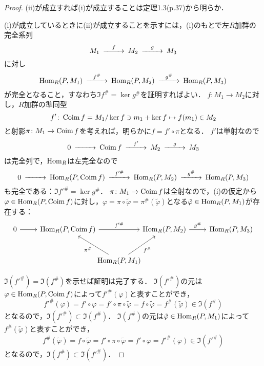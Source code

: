 \begin{proof}
  (ii)が成立すれば(i)が成立することは定理1.3(p.37)から明らか．

  (i)が成立しているときに(ii)が成立することを示すには，(i)のもとで左$R$加群の完全系列
  \[
  \begin{CD}
    M_1 @>{f}>> M_2 @>{g}>> M_3
  \end{CD}
  \]
  に対し
  \[
  \begin{CD}
    \Hom_R(P, M_1) @>{f^\#}>> \Hom_R(P, M_2) @>{g^\#}>> \Hom_R(P, M_3)
  \end{CD}
  \]
  が完全となること，すなわち$\Im f^\# = \ker g^\#$を証明すればよい．
  $f \colon M_1 \to M_2$に対し，$R$加群の準同型
  \[ f' \colon \operatorname{Coim} f = M_1 / \ker f \ni m_1 + \ker f \mapsto f(m_1) \in M_2 \]
  と射影$\pi \colon M_1 \to \operatorname{Coim} f$を考えれば，明らかに$f = f' \circ \pi$となる．
  $f'$は単射なので
  \[
  \begin{CD}
    0 @>>> \Coim f @>{f'}>> M_2 @>{g}>> M_3
  \end{CD}
  \]
  は完全列で，$\operatorname{Hom}_R$は左完全なので
  \[
  \begin{CD}
    0 @>>> \Hom_R(P, \Coim f) @>{f'^\#}>> \Hom_R(P, M_2) @>{g^\#}>> \Hom_R(P, M_3)
  \end{CD}
  \]
  も完全である：$\Im f'^\# = \ker g^\#$．
  $\pi \colon M_1 \to \operatorname{Coim} f$は全射なので，(i)の仮定から$\varphi \in \operatorname{Hom}_R(P, \operatorname{Coim} f)$に対し，$\varphi = \pi \circ \tilde{\varphi} = \pi^\# (\tilde\varphi)$となる$\tilde{\varphi} \in \operatorname{Hom}_R(P, M_1)$が存在する：
  \[
  \begin{tikzcd}
    0 \arrow[r] & \Hom_R(P, \Coim f) \arrow[rr, "f'^\#"] &[-30pt] &[-30pt] \Hom_R(P, M_2) \arrow[r, "g^\#"] & \Hom_R(P, M_3) \\[8pt]
    & & \Hom_R(P, M_1) \arrow[ul, "\pi^\#"]\arrow[ur, "f^\#"']
  \end{tikzcd}
  \]

  $\Im(f'^\#) = \Im(f^\#)$を示せば証明は完了する．
  $\Im(f'^\#)$の元は$\varphi \in \operatorname{Hom}_R(P, \operatorname{Coim} f)$によって$f'^\# (\varphi)$と表すことができ，
  \[f'^\# (\varphi) = f' \circ \varphi = f' \circ \pi \circ \tilde{\varphi} = f \circ \tilde\varphi = f^\# (\tilde\varphi) \in \Im(f^\#)\]
  となるので，$\Im(f'^\#) \subset \Im(f^\#)$．
  $\Im(f^\#)$の元は$\tilde\varphi \in \operatorname{Hom}_R(P, M_1)$によって$f^\#(\tilde\varphi)$と表すことができ，
  \[f^\#(\tilde\varphi) = f \circ \tilde\varphi = f' \circ \pi \circ \tilde{\varphi} = f' \circ \varphi = f'^\# (\varphi) \in \Im(f'^\#)\]
  となるので，$\Im(f^\#) \subset \Im(f'^\#)$．
\end{proof}

